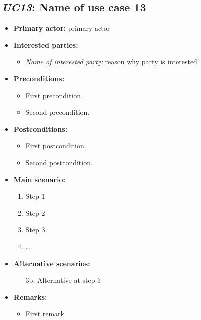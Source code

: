 \documentclass[a4paper,10pt]{article}
\begin{document}
\subsection{\emph{UC13}: Name of use case 13}
\begin{itemize}
    \item \textbf{Primary actor:} primary actor
    \item \textbf{Interested parties:} 
        \begin{itemize}
            \item \textit{Name of interested party:} reason why party is interested
        \end{itemize}

    \item \textbf{Preconditions:}
        \begin{itemize}
            \item First precondition.
            \item Second precondition.
        \end{itemize}

    \item \textbf{Postconditions:}
        \begin{itemize}
            \item First postcondition.
            \item Second postcondition.
        \end{itemize}
        
    \item \textbf{Main scenario:} 
    \begin{enumerate}
       \item Step 1
       \item Step 2
       \item Step 3
       \item \ldots
    \end{enumerate}

    \item \textbf{Alternative scenarios:} 
    \begin{enumerate}
        \item [3b.] Alternative at step 3
    \end{enumerate}
    
    \item \textbf{Remarks:}
        \begin{itemize}
            \item First remark
        \end{itemize}
\end{itemize}
\end{document}

